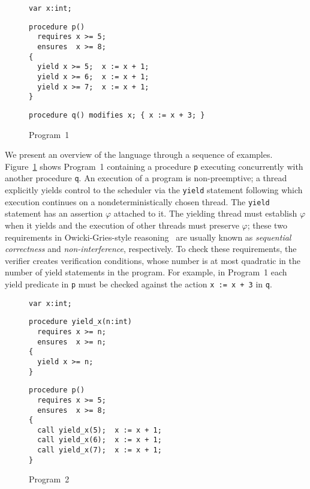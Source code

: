 \begin{figure}
\begin{verbatim}
var x:int;
\end{verbatim}
\begin{verbatim}
procedure p()
  requires x >= 5;
  ensures  x >= 8;
{
  yield x >= 5;  x := x + 1;
  yield x >= 6;  x := x + 1;
  yield x >= 7;  x := x + 1;
}
\end{verbatim}
\begin{verbatim}
procedure q() modifies x; { x := x + 3; }
\end{verbatim}
\caption{Program~1}
\label{fig:ex1}
\end{figure}

We present an overview of the \civl language through a sequence of examples.
Figure~\ref{fig:ex1} shows Program~1 containing a procedure {\tt p}
executing concurrently with another procedure {\tt q}. 
An execution of a \civl program is non-preemptive; a thread explicitly yields control to the
scheduler via the {\tt yield} statement following which execution continues on a 
nondeterministically chosen thread.
The {\tt yield} statement has an assertion $\varphi$ attached to it.
The yielding thread must establish $\varphi$ when it yields and the execution of other threads 
must preserve $\varphi$; these two requirements in Owicki-Gries-style
reasoning~\cite{OwickiG76} are usually known as {\em sequential correctness}
and {\em non-interference}, respectively.
To check these requirements, the \civl verifier creates verification conditions, whose number is at most
quadratic in the number of yield statements in the program.
For example, in Program~1 each yield predicate in {\tt p} must be checked against the action 
{\tt x := x + 3} in {\tt q}.


\begin{figure}
\begin{verbatim}
var x:int;
\end{verbatim}
\begin{verbatim}
procedure yield_x(n:int)
  requires x >= n;
  ensures  x >= n;
{
  yield x >= n;
}
\end{verbatim}
\begin{verbatim}
procedure p()
  requires x >= 5;
  ensures  x >= 8;
{
  call yield_x(5);  x := x + 1;
  call yield_x(6);  x := x + 1;
  call yield_x(7);  x := x + 1;
}
\end{verbatim}
\caption{Program~2}
\label{fig:ex2}
\end{figure}

